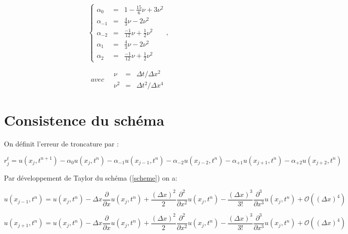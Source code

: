 \documentclass[a4paper,11pt]{article}
\begin{document}
\begin{equation*}
    \left\{
    \begin{array}{rcl}
        \alpha_{0} &=& 1 - \scriptstyle \frac{15}{6} \nu + 3 \nu^{2} \\
        \alpha_{-1} &=& \scriptstyle \frac{4}{3} \nu - 2 \nu^{2} \\
        \alpha_{-2} &=& \scriptstyle \frac{-1}{12} \nu + \frac{1}{2} \nu^{2} \\
        \alpha_{1} &=& \scriptstyle \frac{4}{3} \nu - 2 \nu^{2} \\
        \alpha_{2} &=& \scriptstyle \frac{-1}{12} \nu + \frac{1}{2} \nu^{2}
    \end{array}
    \right.,
\end{equation*}

\begin{equation*}
    avec \quad
    \begin{array}{rcl}
        \nu &=& \Delta t/\Delta x^{2} \\
        \nu^{2} &=& \Delta t^{2}/\Delta x^{4}
    \end{array}
\end{equation*}

\section{Consistence du schéma}

On définit l'erreur de troncature par :

\begin{equation*}
    r^{t}_{j} = u(x_{j}, t^{n+1}) -\alpha_{0} u(x_{j}, t^{n}) -\alpha_{-1} u(x_{j-1}, t^{n}) -\alpha_{-2} u(x_{j-2}, t^{n}) -\alpha_{+1} u(x_{j+1}, t^{n}) -\alpha_{+2} u(x_{j+2}, t^{n})
\end{equation*}

Par développement de Taylor du schéma (\ref{scheme}) on a:

\begin{equation*}
    u(x_{j-1}, t^{n}) =
    u(x_{j}, t^{n})
     - \Delta x \frac{\partial}{\partial x}u(x_{j}, t^{n})
     + \frac{(\Delta x)^{2}}{2} \frac{\partial^{2}}{\partial x^{2}}u(x_{j}, t^{n})
     - \frac{(\Delta x)^{3}}{3!} \frac{\partial^{3}}{\partial x^{3}}u(x_{j}, t^{n})
     + \mathcal{O}((\Delta x)^{4})
\end{equation*}

\begin{equation*}
    u(x_{j+1}, t^{n}) =
    u(x_{j}, t^{n})
     - \Delta x \frac{\partial}{\partial x}u(x_{j}, t^{n})
     + \frac{(\Delta x)^{2}}{2} \frac{\partial^{2}}{\partial x^{2}}u(x_{j}, t^{n})
     - \frac{(\Delta x)^{3}}{3!} \frac{\partial^{3}}{\partial x^{3}}u(x_{j}, t^{n})
     + \mathcal{O}((\Delta x)^{4})
\end{equation*}
\end{document}

